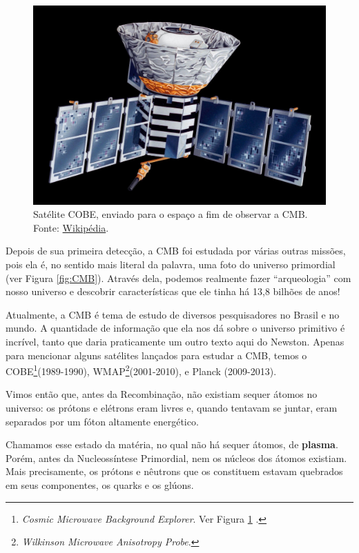\begin{multicols}{2}
\begin{figure}[H]
	\centering
	\includegraphics[width=0.8\linewidth]{Figuras/Artigo1/COBE.jpg}
	\caption{Satélite COBE, enviado para o espaço a fim de observar a CMB. Fonte: \href{https://en.wikipedia.org/wiki/List_of_cosmic_microwave_background_experiments\#/media/File:Cobe_vision1.jpg}{Wikipédia}.}
	\label{fig:COBE}
\end{figure}

Depois de sua primeira detecção, a CMB foi estudada por várias outras missões, pois ela é, no sentido mais literal da palavra, uma foto do universo primordial (ver Figura \ref{fig:CMB}). Através dela, podemos realmente fazer ``arqueologia'' com nosso universo e descobrir características que ele tinha há 13,8 bilhões de anos!

Atualmente, a CMB é tema de estudo de diversos pesquisadores no Brasil e no mundo. A quantidade de informação que ela nos dá sobre o universo primitivo é incrível, tanto que daria praticamente um outro texto aqui do Newston. Apenas para mencionar alguns satélites lançados para estudar a CMB, temos o COBE\footnote{\textit{Cosmic Microwave Background Explorer}. Ver Figura \ref{fig:COBE} .}(1989-1990), WMAP\footnote{\textit{Wilkinson Microwave Anisotropy Probe}.}(2001-2010), e Planck (2009-2013).




Vimos então que, antes da Recombinação, não existiam sequer átomos no universo: os prótons e elétrons eram livres e, quando tentavam se juntar, eram separados por um fóton altamente energético.

Chamamos esse estado da matéria, no qual não há sequer átomos, de \textbf{plasma}. Porém, antes da Nucleossíntese Primordial, nem os núcleos dos átomos existiam. Mais precisamente, os prótons e nêutrons que os constituem estavam quebrados em seus componentes, os quarks e os glúons.


\end{multicols}

